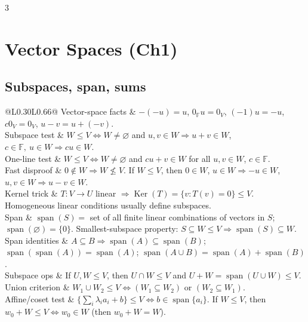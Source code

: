\documentclass[10pt]{article}
\makeatletter
\newcommand{\F}{\mathbb{F}}
\newcommand{\Ker}{\operatorname{Ker}}
\newcommand{\spann}{\operatorname{span}}
\newcommand{\cheattable}[1]{\begin{tabular}{@{}L{0.30\columnwidth}L{0.66\columnwidth}@{}}#1\end{tabular}}
\makeatother
\begin{document}
\begin{multicols}{3}
\footnotesize

\section*{Vector Spaces (Ch1)}

\subsection*{Subspaces, span, sums}
\cheattable{
Vector-space facts & $-(-u)=u$, $0_{\F}u=0_V$, $(-1)u=-u$, $c0_V=0_V$, $u-v=u+(-v)$.\\
Subspace test & $W\le V \iff W\neq\varnothing$ and $u,v\in W\Rightarrow u+v\in W$, $c\in\F,\ u\in W\Rightarrow cu\in W$.\\
One-line test & $W\le V \iff W\neq\varnothing$ and $cu+v\in W$ for all $u,v\in W$, $c\in\F$.\\
Fast disproof & $0\notin W\Rightarrow W\not\le V$. If $W\le V$, then $0\in W$, $u\in W\Rightarrow -u\in W$, $u,v\in W\Rightarrow u-v\in W$.\\
Kernel trick & $T:V\to U$ linear $\Rightarrow \Ker(T)=\{v:T(v)=0\}\le V$. Homogeneous linear conditions usually define subspaces.\\
Span & $\spann(S)=$ set of all finite linear combinations of vectors in $S$; $\spann(\varnothing)=\{0\}$. Smallest-subspace property: $S\subseteq W\le V\Rightarrow \spann(S)\subseteq W$.\\
Span identities & $A\subseteq B\Rightarrow \spann(A)\subseteq\spann(B)$; $\spann(\spann(A))=\spann(A)$; $\spann(A\cup B)=\spann(A)+\spann(B)$.\\
Subspace ops & If $U,W\le V$, then $U\cap W\le V$ and $U+W=\spann(U\cup W)\le V$.\\
Union criterion & $W_1\cup W_2\le V \iff (W_1\subseteq W_2)$ or $(W_2\subseteq W_1)$.\\
Affine/coset test & $\{\sum_i\lambda_i a_i+b\}\le V \iff b\in\spann\{a_i\}$. If $W\le V$, then $w_0+W\le V \iff w_0\in W$ (then $w_0+W=W$).\\
}


\end{multicols}
\end{document}
